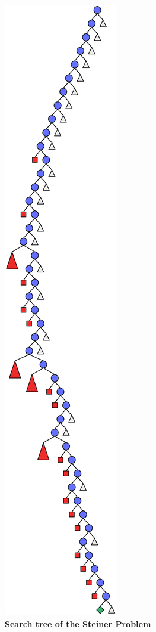 \documentclass[a4paper,halfparskip]{scrartcl}
\begin{document}
\begin{figure}[htpb]
\centerline{\includegraphics*[scale=0.3]{figs/steiner1.eps}}
\caption{\textbf{Search tree of the Steiner Problem}}
\label{figure 13}
\end{figure}
\end{document}
